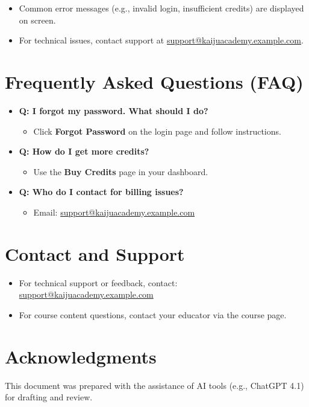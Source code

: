 \documentclass[a4paper,11pt]{scrartcl}
\begin{document}
\begin{itemize}[leftmargin=*]
    \item Common error messages (e.g., invalid login, insufficient credits) are displayed on screen.
    \item For technical issues, contact support at \href{mailto:support@kaijuacademy.example.com}{support@kaijuacademy.example.com}.
\end{itemize}

\section{Frequently Asked Questions (FAQ)}

\begin{itemize}[leftmargin=*]
    \item \textbf{Q: I forgot my password. What should I do?}
    \begin{itemize}
        \item Click \textbf{Forgot Password} on the login page and follow instructions.
    \end{itemize}
    \item \textbf{Q: How do I get more credits?}
    \begin{itemize}
        \item Use the \textbf{Buy Credits} page in your dashboard.
    \end{itemize}
    \item \textbf{Q: Who do I contact for billing issues?}
    \begin{itemize}
        \item Email: \href{mailto:support@kaijuacademy.example.com}{support@kaijuacademy.example.com}
    \end{itemize}
\end{itemize}

\section{Contact and Support}

\begin{itemize}[leftmargin=*]
    \item For technical support or feedback, contact: \href{mailto:support@kaijuacademy.example.com}{support@kaijuacademy.example.com}
    \item For course content questions, contact your educator via the course page.
\end{itemize}

\section{Acknowledgments}
This document was prepared with the assistance of AI tools (e.g., ChatGPT 4.1) for drafting and review.
\end{document}
